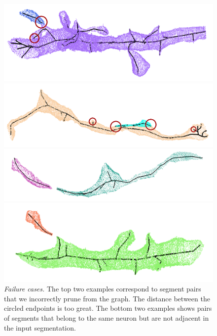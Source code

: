 \begin{figure}[t!]
	\centering
	\begin{minipage}{0.45\linewidth}
		\includegraphics[width=\linewidth]{./figures/merge_candidate1.png}	
	\end{minipage}
	\hfill
	\begin{minipage}{0.45\linewidth}	
		\includegraphics[width=\linewidth]{./figures/merge_candidate2.png}
	\end{minipage}
	\begin{minipage}{0.45\linewidth}
		\includegraphics[width=\linewidth]{./figures/merge_candidate3.png}
	\end{minipage}
	\begin{minipage}{0.45\linewidth}
		\includegraphics[width=\linewidth]{./figures/merge_candidate4.png}
	\end{minipage}
	\caption{\textit{Failure cases.} The top two examples correspond to segment pairs that we incorrectly prune from the graph. The distance between the circled endpoints is too great. The bottom two examples shows pairs of segments that belong to the same neuron but are not adjacent in the input segmentation.}
	\label{fig:skeleton-results}
\end{figure}
